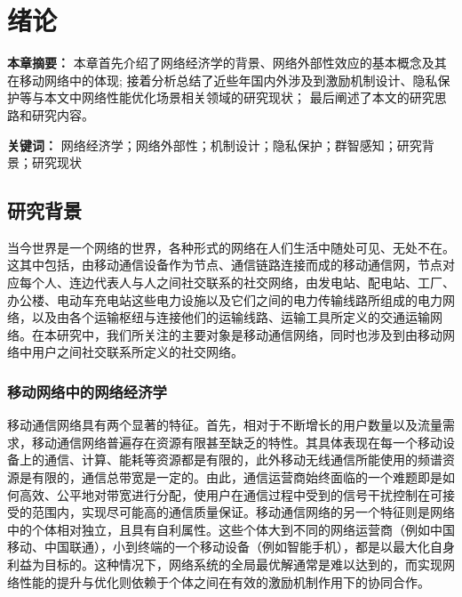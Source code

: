 \chapter{绪论}

\textbf{本章摘要：} 本章首先介绍了网络经济学的背景、网络外部性效应的基本概念及其在移动网络中的体现; 
接着分析总结了近些年国内外涉及到激励机制设计、隐私保护等与本文中网络性能优化场景相关领域的研究现状；
最后阐述了本文的研究思路和研究内容。

\textbf{关键词：} 网络经济学；网络外部性；机制设计；隐私保护；群智感知；研究背景；研究现状


\section{研究背景}

当今世界是一个网络的世界，各种形式的网络在人们生活中随处可见、无处不在。这其中包括，由移动通信设备作为节点、通信链路连接而成的移动通信网，节点对应每个人、连边代表人与人之间社交联系的社交网络，由发电站、配电站、工厂、办公楼、电动车充电站这些电力设施以及它们之间的电力传输线路所组成的电力网络，以及由各个运输枢纽与连接他们的运输线路、运输工具所定义的交通运输网络。在本研究中，我们所关注的主要对象是移动通信网络，同时也涉及到由移动网络中用户之间社交联系所定义的社交网络。

\subsection{移动网络中的网络经济学}

移动通信网络具有两个显著的特征。首先，相对于不断增长的用户数量以及流量需求，移动通信网络普遍存在资源有限甚至缺乏的特性。其具体表现在每一个移动设备上的通信、计算、能耗等资源都是有限的，此外移动无线通信所能使用的频谱资源是有限的，通信总带宽是一定的。由此，通信运营商始终面临的一个难题即是如何高效、公平地对带宽进行分配，使用户在通信过程中受到的信号干扰控制在可接受的范围内，实现尽可能高的通信质量保证。移动通信网络的另一个特征则是网络中的个体相对独立，且具有自利属性。这些个体大到不同的网络运营商（例如中国移动、中国联通），小到终端的一个移动设备（例如智能手机），都是以最大化自身利益为目标的。这种情况下，网络系统的全局最优解通常是难以达到的，而实现网络性能的提升与优化则依赖于个体之间在有效的激励机制作用下的协同合作。  

